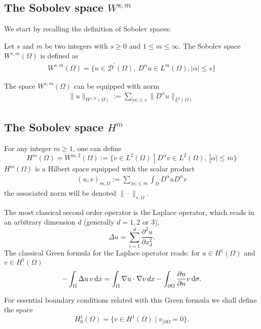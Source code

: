 \subsection{The Sobolev space $W^{s,m}$}
We start by recalling the definition of Sobolev spaces:
\begin{definition}
  Let $s$ and $m$ be two integers with $s \geq 0$ and $1 \leq m \leq \infty$. The Sobolev space $W^{s,m}(\Omega)$ is defined as
  \begin{align}
    W^{s,m}(\Omega) = \{ u \in \mathcal{D}^\prime(\Omega), ~ D^{\alpha} u \in L^m(\Omega), | \alpha | \leq s \}
    \label{eq:sobolev-space}
  \end{align}
\end{definition}
The space $W^{s,m}(\Omega)$ can be equipped with norm
\begin{align}
  \| u \|_{W^{s,m}(\Omega)} := \sum\limits_{|\alpha| \leq s} \| D^{\alpha} u \|_{L^p(\Omega)}
  \label{eq:sobolev-space-norm}
\end{align}
%
\subsection{The Sobolev space $H^m$}

For any integer $m\geq 1$, one can define
\begin{equation}\label{eq:hm}
H^m(\Omega) = W^{m,2}(\Omega) := \{  v \in L^2( \Omega) \;|\; D^\alpha v \in L^2( \Omega), ~|\alpha|\leq m  \} 
\end{equation}
$H^m(\Omega)$ is a Hilbert space equipped with the scalar product 
\begin{align}
  \left( u,v \right)_{m, \Omega} := \sum\limits_{|\alpha| \leq m} \int_{\Omega} D^\alpha u D^\alpha v 
  \label{eq:sobolev-space-scalar-product}
\end{align}
the associated norm will be denoted $\| \cdot \|_{s,\Omega}$.

The most classical  second order operator is the Laplace operator, which reads in an arbitrary dimension $d$ (generally $d=1,2$ or $3$), $$\Delta u = \sum_{i=1}^d \frac{\partial^2 u}{\partial x_d^2}.$$
The classical Green formula for the Laplace operator reads: 
for $u\in H^1(\Omega)$ and $v\in H^1(\Omega)$ 
\begin{equation}\label{eq:greenlap}
  -\int_\Omega\Delta u\, v\,{\rm d} x=\int_\Omega\nabla u\cdot\nabla v\, dx -\int_{\partial\Omega} \frac{\partial u}{\partial n}
v\,{\rm d} \sigma.
\end{equation}


For essential boundary conditions related with this Green formula we shall define the space
$$H^1_0(\Omega) = \{ v \in H^1(\Omega) \;|\; v_{|\partial\Omega} =0 \}.$$

